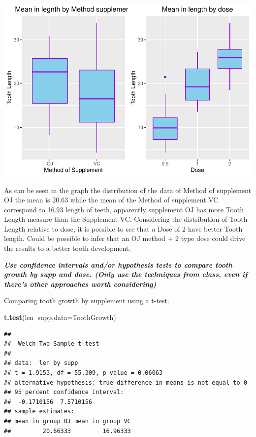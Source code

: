 \documentclass[
]{article}
\newenvironment{Shaded}{\begin{snugshade}}{\end{snugshade}}
\newcommand{\DataTypeTok}[1]{\textcolor[rgb]{0.13,0.29,0.53}{#1}}
\newcommand{\KeywordTok}[1]{\textcolor[rgb]{0.13,0.29,0.53}{\textbf{#1}}}
\newcommand{\NormalTok}[1]{#1}
\newcommand{\OperatorTok}[1]{\textcolor[rgb]{0.81,0.36,0.00}{\textbf{#1}}}
\begin{document}
\includegraphics{Statistical-Inference-Course-Project-2_files/figure-latex/means-1.pdf}

As can be seen in the graph the distribution of the data of Method of
supplement OJ the mean is 20.63 while the mean of the Method of
supplement VC correspond to 16.93 length of teeth, apparently supplement
OJ has more Tooth Length measure than the Supplement VC. Considering the
distribution of Tooth Length relative to dose, it is possible to see
that a Dose of 2 have better Tooth length. Could be possible to infer
that an OJ method + 2 type dose could drive the results to a better
tooth development.

\textbf{\emph{Use confidence intervals and/or hypothesis tests to
compare tooth growth by supp and dose. (Only use the techniques from
class, even if there's other approaches worth considering)}}

Comparing tooth growth by supplement using a t-test.

\begin{Shaded}
\begin{Highlighting}[]
\KeywordTok{t.test}\NormalTok{(len}\OperatorTok{~}\NormalTok{supp,}\DataTypeTok{data=}\NormalTok{ToothGrowth)}
\end{Highlighting}
\end{Shaded}

\begin{verbatim}
## 
##  Welch Two Sample t-test
## 
## data:  len by supp
## t = 1.9153, df = 55.309, p-value = 0.06063
## alternative hypothesis: true difference in means is not equal to 0
## 95 percent confidence interval:
##  -0.1710156  7.5710156
## sample estimates:
## mean in group OJ mean in group VC 
##         20.66333         16.96333
\end{verbatim}
\end{document}
